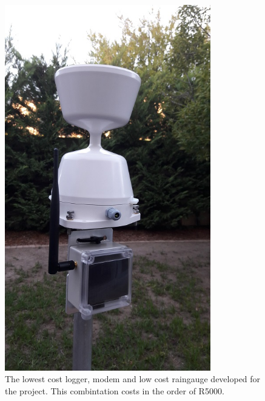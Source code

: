 \documentclass{wrcreport}
\begin{document}
\begin{figure}[!htp]
  \begin{center}
\includegraphics[width=0.8\textwidth]{RainLogger_1.jpg}
  \end{center}
  \caption[The lowest cost logger, modem and low cost raingauge developed for the project]{The lowest cost logger, modem and low cost raingauge developed for the project. This combintation costs in the order of R5000.}
  \label{fig:logger1}
\end{figure}
\end{document}
